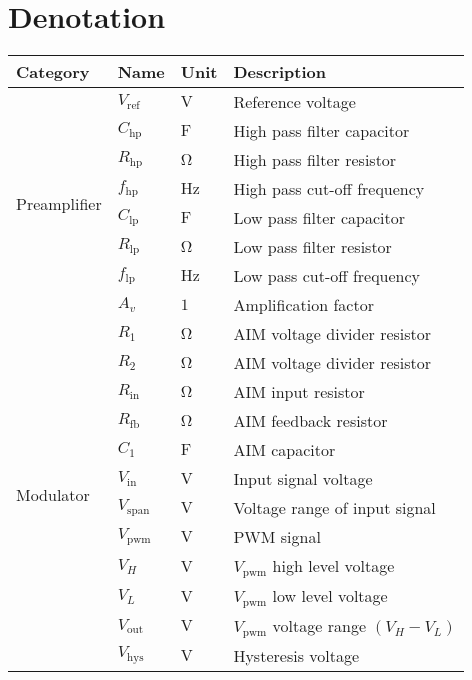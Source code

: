 \newpage
\chapter*{Denotation} \label{cha:denotation}
\begin{longtable}{@{}llll@{}}
	\toprule
	\textbf{Category } & \textbf{Name}    & \textbf{Unit}        & \textbf{Description} \\ \midrule
	\endhead
	\multirow{8}{*}{Preamplifier}       & $V_{\mathrm{ref}}$ & $\si{\volt}$ & Reference voltage \\
	& $C_{\mathrm{hp}}$ & $\si{\farad}$ & High pass filter capacitor \\
	& $R_{\mathrm{hp}}$ & $\si{\ohm}$ & High pass filter resistor \\
	& $f_{\mathrm{hp}}$ & $\si{\hertz}$ & High pass cut-off frequency \\
	& $C_{\mathrm{lp}}$ & $\si{\farad}$ & Low pass filter capacitor \\
	& $R_{\mathrm{lp}}$ & $\si{\ohm}$ & Low pass filter resistor \\
	& $f_{\mathrm{lp}}$ & $\si{\hertz}$ & Low pass cut-off frequency \\
	& $A_{v}$ & $1$ & Amplification factor \\ \midrule
	\multirow{27}{*}{Modulator} & $R_{1}$ & $\si{\ohm}$ & AIM voltage divider resistor \\
	& $R_{2}$ & $\si{\ohm}$ & AIM voltage divider resistor \\
	& $R_{\mathrm{in}}$ & $\si{\ohm}$ & AIM input resistor \\
	& $R_{\mathrm{fb}}$ & $\si{\ohm}$ & AIM feedback resistor \\
	& $C_{1}$ & $\si{\farad}$ & AIM capacitor \\
	& $V_{\mathrm{in}}$ & $\si{\volt}$ & Input signal voltage \\
	& $V_{\mathrm{span}}$ & $\si{\volt}$ & Voltage range of input signal \\ %
	& $V_{\mathrm{pwm}}$ & $\si{\volt}$ & PWM signal \\
	& $V_{H}$ & $\si{\volt}$ & $V_{\mathrm{pwm}}$ high level voltage \\
	& $V_{L}$ & $\si{\volt}$ & $V_{\mathrm{pwm}}$ low level voltage \\
	& $V_{\mathrm{out}}$ & $\si{\volt}$ & $V_{\mathrm{pwm}}$ voltage range $\left( V_{H} - V_{L} \right) $ \\
	& $V_{\mathrm{hys}}$ & $\si{\volt}$ & Hysteresis voltage \\

\end{longtable}
